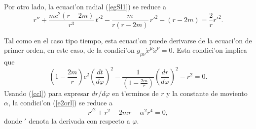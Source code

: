 Por otro lado, la ecuaci'on radial (\ref{egSl1}) se reduce a
\begin{equation}
 r''+\frac{mc^2(r-2m)}{r^3}\,t'^2-\frac{m}{r\left(r-2m\right) }\,r'^2-(r-2m) =\frac{2}{r}r'^2. \label{ecr2l}
\end{equation}

Tal como en el caso tipo tiempo, esta ecuaci'on puede derivarse de la ecuaci'on de primer orden, en este caso, de la condici'on $g_{\mu\nu}\dot{x}^\mu\dot{x}^\nu=0$. Esta condici'on implica que
\begin{equation}
\left(1-\frac{2m}{r}\right)c^2\left(\frac{dt}{d\varphi}\right)^2-\frac{1}{\left(1-\frac{2m}{r}\right)}\left(\frac{dr}{d\varphi}\right)^2-r^2=0. \label{e2orl}
\end{equation}
Usando (\ref{ccl}) para expresar $dr/d\varphi$ en t'erminos de $r$ y la constante de moviento $\alpha$, la condici'on (\ref{e2orl}) se reduce a
\begin{equation}\label{ecrpf}
 r'^2+r^2-2mr-\alpha^2r^4=0,
\end{equation}
donde $'$ denota la derivada con respecto a $\varphi$.

